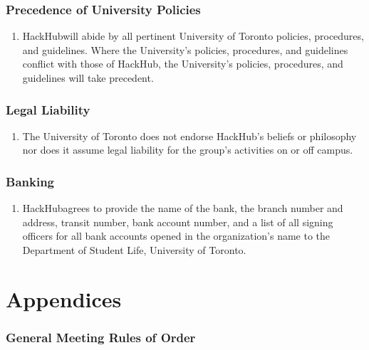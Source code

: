 \documentclass[12pt]{article}
\newcommand{\orgname}{HackHub\space}
\begin{document}
\section{Precedence of University Policies}
\begin{enumerate}[{15}.1]
    \item \orgname will abide by all pertinent University of Toronto policies, procedures, and guidelines. Where the University’s policies, procedures, and guidelines conflict with those of \orgname, the University’s policies, procedures, and guidelines will take precedent.
\end{enumerate}


\section{Legal Liability}
\begin{enumerate}[{16}.1]
    \item The University of Toronto does not endorse \orgname’s beliefs or philosophy nor does it assume legal liability for the group’s activities on or off campus.\end{enumerate}


\section{Banking}
\begin{enumerate}[{17}.1]
    \item \orgname agrees to provide the name of the bank, the branch number and address, transit number, bank account number, and a list of all signing officers for all bank accounts opened in the organization’s name to the Department of Student Life, University of Toronto.
\end{enumerate}



\pagebreak[4]
\appendix
\part{Appendices}

\section{General Meeting Rules of Order}


\end{document}
